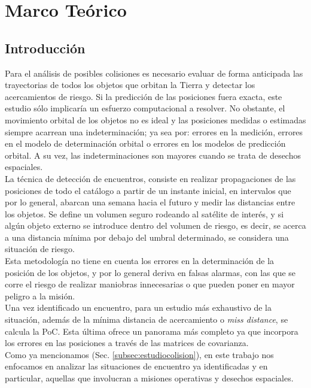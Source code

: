 \chapter{Marco Teórico}
\label{chap:marcoteorico}

\section{Introducci\'on}

Para el an\'alisis de posibles colisiones es necesario evaluar de forma anticipada las trayectorias de todos los objetos que orbitan la Tierra y detectar los acercamientos de riesgo. Si la predicci\'on de las posiciones fuera exacta, este estudio s\'olo implicar\'ia un esfuerzo computacional a resolver. No obstante, el movimiento orbital de los objetos no es ideal y las posiciones medidas o estimadas siempre acarrean una indeterminaci\'on; ya sea por: errores en la medici\'on, errores en el modelo de determinaci\'on orbital o errores en los modelos de predicci\'on orbital. A su vez, las indeterminaciones son mayores cuando se trata de desechos espaciales.\\

La t\'ecnica de detecci\'on de encuentros, consiste en realizar propagaciones de las posiciones de todo el cat\'alogo a partir de un instante inicial, en intervalos que por lo general, abarcan una semana hacia el futuro y medir las distancias entre los objetos. Se define un volumen seguro rodeando al sat\'elite de inter\'es, y si alg\'un objeto externo se introduce dentro del volumen de riesgo, es decir, se acerca a una distancia m\'inima por debajo del umbral determinado, se considera una situaci\'on de riesgo.\\ 
Esta metodolog\'ia no tiene en cuenta los errores en la determinaci\'on de la posici\'on de los objetos, y por lo general deriva en falsas alarmas, con las que se corre el riesgo de realizar maniobras innecesarias o que pueden poner en mayor peligro a la misi\'on.\\
Una vez identificado un encuentro, para un estudio m\'as exhaustivo de la situaci\'on, adem\'as de la m\'inima distancia de acercamiento o {\it{miss distance}}, se calcula la PoC.  Esta \'ultima ofrece un panorama m\'as completo ya que incorpora los errores en las posiciones a trav\'es de las matrices de covarianza.\\

Como ya mencionamos (Sec. \ref{subsec:estudiocolision}), en este trabajo nos enfocamos en analizar las situaciones de encuentro ya identificadas y en particular, aquellas que involucran a misiones operativas y desechos espaciales.\\

